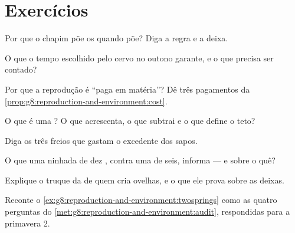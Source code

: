\section{Exercícios}

\begin{exercise}[$\star$]\label{exo:g8:reproduction-and-environment:1}
Por que o chapim põe os  quando põe? Diga a regra e a deixa.
\end{exercise}

\begin{exercise}[$\star$]\label{exo:g8:reproduction-and-environment:2}
O que o tempo escolhido pelo cervo no outono garante, e o que precisa
ser contado?
\end{exercise}

\begin{exercise}[$\star$]\label{exo:g8:reproduction-and-environment:3}
Por que a reprodução é ``paga em matéria''? Dê três pagamentos da
\cref{prop:g8:reproduction-and-environment:cost}.
\end{exercise}

\begin{exercise}[$\star$]\label{exo:g8:reproduction-and-environment:4}
O que é uma ? O que acrescenta, o que subtrai e o que define
o teto?
\end{exercise}

\begin{exercise}[$\star$]\label{exo:g8:reproduction-and-environment:5}
Diga os três freios que gastam o excedente dos sapos.
\end{exercise}

\begin{exercise}[$\star$]\label{exo:g8:reproduction-and-environment:6}
O que uma ninhada de dez , contra uma de seis, informa --- e sobre
o quê?
\end{exercise}

\begin{exercise}[$\star\star$]\label{exo:g8:reproduction-and-environment:7}
Explique o truque da  de quem cria ovelhas, e o que ele prova sobre
as deixas.
\end{exercise}

\begin{exercise}[$\star\star$]\label{exo:g8:reproduction-and-environment:8}
Reconte o \cref{ex:g8:reproduction-and-environment:twosprings} como as
quatro perguntas do
\cref{met:g8:reproduction-and-environment:audit}, respondidas para a
primavera 2.
\end{exercise}


